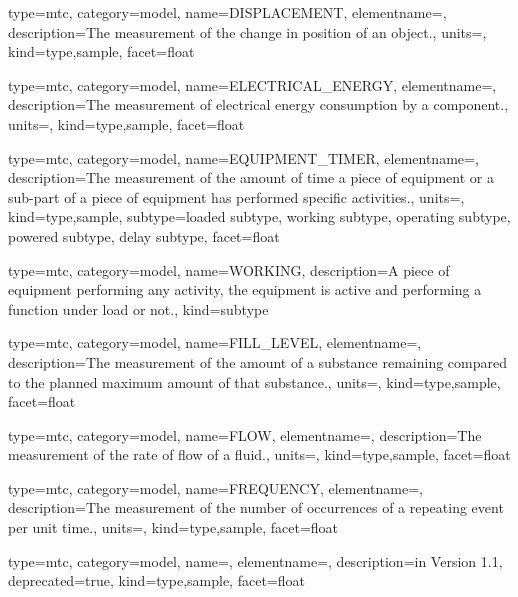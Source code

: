 {
  type=mtc,
  category=model,
  name={DISPLACEMENT},
  elementname=,
  description={The measurement of the change in position of an object.},
  units=,
  kind={type,sample},
  facet={\gls{float}}
}


{
  type=mtc,
  category=model,
  name={ELECTRICAL\_ENERGY},
  elementname=,
  description={The measurement of electrical energy consumption by a component.},
  units=,
  kind={type,sample},
  facet={\gls{float}}
}


{
  type=mtc,
  category=model,
  name={EQUIPMENT\_TIMER},
  elementname=,
  description={The measurement of the amount of time a piece of equipment or a sub-part of a piece of equipment has performed specific activities.},
  units=,
  kind={type,sample},
  subtype={\gls{loaded subtype}, \gls{working subtype}, \gls{operating subtype}, \gls{powered subtype}, \gls{delay subtype}},
  facet={\gls{float}}
}



{
  type=mtc,
  category=model,
  name={WORKING},
  description={A piece of equipment performing any activity, the equipment is active and performing a function under load or not.},
  kind={subtype}
}


{
  type=mtc,
  category=model,
  name={FILL\_LEVEL},
  elementname=,
  description={The measurement of the amount of a substance remaining compared to the planned maximum amount of that substance.},
  units=,
  kind={type,sample},
  facet={\gls{float}}
}


{
  type=mtc,
  category=model,
  name={FLOW},
  elementname=,
  description={The measurement of the rate of flow of a fluid.},
  units=,
  kind={type,sample},
  facet={\gls{float}}
}


{
  type=mtc,
  category=model,
  name={FREQUENCY},
  elementname=,
  description={The measurement of the number of occurrences of a repeating event per unit time.},
  units=,
  kind={type,sample},
  facet={\gls{float}}
}


{
  type=mtc,
  category=model,
  name=,
  elementname=,
  description={\DEPRECATED in Version 1.1},
  deprecated={true},
  kind={type,sample},
  facet={\gls{float}}
}


